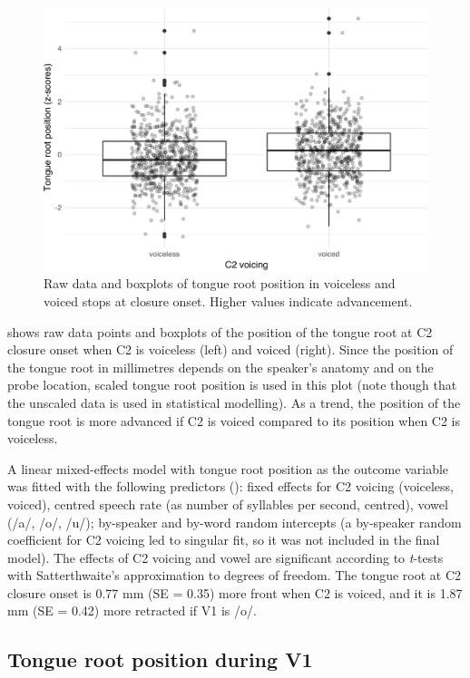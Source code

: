 \documentclass[
  12pt,
]{article}
\begin{document}
\begin{figure}
\includegraphics[width=\linewidth]{2018-tra_files/figure-latex/trp-z-box-1} \caption{Raw data and boxplots of tongue root position in voiceless and voiced stops at closure onset. Higher values indicate advancement.}\label{f:trp-z-box}
\end{figure}

 shows raw data points and boxplots of the position of
the tongue root at C2 closure onset when C2 is voiceless (left) and
voiced (right). Since the position of the tongue root in millimetres
depends on the speaker's anatomy and on the probe location, scaled
tongue root position is used in this plot (note though that the unscaled
data is used in statistical modelling). As a trend, the position of the
tongue root is more advanced if C2 is voiced compared to its position
when C2 is voiceless.

A linear mixed-effects model with tongue root position as the outcome
variable was fitted with the following predictors
(): fixed effects for C2 voicing (voiceless,
voiced), centred speech rate (as number of syllables per second,
centred), vowel (/a/, /o/, /u/); by-speaker and by-word random
intercepts (a by-speaker random coefficient for C2 voicing led to
singular fit, so it was not included in the final model). The effects of
C2 voicing and vowel are significant according to \emph{t}-tests with
Satterthwaite's approximation to degrees of freedom. The tongue root at
C2 closure onset is 0.77 mm (SE = 0.35) more front when C2 is voiced,
and it is 1.87 mm (SE = 0.42) more retracted if V1 is /o/.

\hypertarget{tongue-root-position-during-v1}{%
\subsection{Tongue root position during
V1}\label{tongue-root-position-during-v1}}
\end{document}
